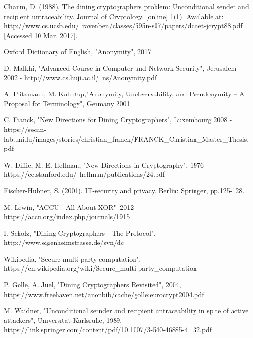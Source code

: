 \documentclass[12pt]{informatics-report}
\begin{document}
\begin{thebibliography}{99}

 Chaum, D. (1988). The dining cryptographers problem: Unconditional sender and recipient untraceability. Journal of Cryptology, [online] 1(1). Available at: http://www.cs.ucsb.edu/~ravenben/classes/595n-s07/papers/dcnet-jcrypt88.pdf [Accessed 10 Mar. 2017].

 Oxford Dictionary of English, "Anonymity", 2017

 D. Malkhi, "Advanced Course in Computer and Network Security", Jerusalem 2002 - http://www.cs.huji.ac.il/~ns/Anonymity.pdf

 A. Pfitzmann, M. Kohntop,"Anonymity, Unobservability, and Pseudonymity – A Proposal for Terminology", Germany 2001

 C. Franck, "New Directions for Dining Cryptographers", Luxembourg 2008 - https://secan-lab.uni.lu/images/stories/christian{\_}franck/FRANCK{\_}Christian{\_}Master{\_}Thesis.pdf

 W. Diffie, M. E. Hellman, "New Directions in Cryptography", 1976 https://ee.stanford.edu/~hellman/publications/24.pdf

 Fischer-Hubner, S. (2001). IT-security and privacy. Berlin: Springer, pp.125-128.

 M. Lewin, "ACCU - All About XOR", 2012 https://accu.org/index.php/journals/1915

 I. Scholz, "Dining Cryptographers - The Protocol", http://www.eigenheimstrasse.de/svn/dc

 Wikipedia, "Secure multi-party computation". https://en.wikipedia.org/wiki/Secure{\_}multi-party{\_}computation

 P. Golle, A. Juel, "Dining Cryptographers Revisited", 2004, https://www.freehaven.net/anonbib/cache/golle:eurocrypt2004.pdf 

 M. Waidner, "Unconditional sernder and recipient untraceability in spite of active attackers", Universitat Karlsruhe, 1989, https://link.springer.com/content/pdf/10.1007/3-540-46885-4{\_}32.pdf


\end{thebibliography}



\appendix


\end{document}
